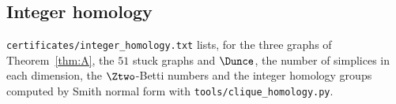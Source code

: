 \subsection{Integer homology}
\texttt{certificates/integer\_homology.txt} lists, for the three graphs of Theorem~\ref{thm:A}, the $51$ stuck graphs and $\Dunce$, the number of simplices in each dimension, the $\Ztwo$-Betti numbers and the integer homology groups computed by Smith normal form with \texttt{tools/clique\_homology.py}.

\FloatBarrier
